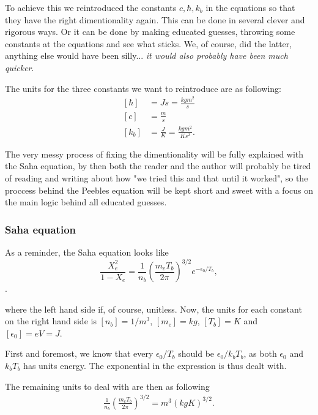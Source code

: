 \documentclass[12pt]{article}
\begin{document}
To achieve this we reintroduced the constants $c, \hbar, k_b$ in the equations so that they have the right dimentionality again. This can be done in several clever and rigorous ways. Or it can be done by making educated guesses, throwing some constants at the equations and see what sticks. We, of course, did the latter, anything else would have been silly... \textit{it would also probably have been much quicker}.

The units for the three constants we want to reintroduce are as following:
\begin{align*}
    \left[\hbar\right] &= Js = \frac{kgm^2}{s} \\
    \left[c\right] &= \frac{m}{s} \\
    \left[k_b\right] &= \frac{J}{K} = \frac{kgm^2}{Ks^2}.
\end{align*}

The very messy process of fixing the dimentionality will be fully explained with the Saha equation, by then both the reader and the author will probably be tired of reading and writing about how "we tried this and that until it worked", so the proccess behind the Peebles equation will be kept short and sweet with a focus on the main logic behind all educated guesses.

\subsubsection{Saha equation}
As a reminder, the Saha equation looks like 
\begin{equation}\label{eq: saha equation again}
    \frac{X_{e}^{2}}{1-X_{e}}=\frac{1}{n_{b}}\left(\frac{m_{e} T_{b}}{2 \pi}\right)^{3 / 2} e^{-\epsilon_{0} / T_{b}},
\end{equation}.

where the left hand side if, of course, unitless. Now, the units for each constant on the right hand side is $[n_b] = 1/m^3$, $[m_e]=kg$, $[T_b] = K$ and $[\epsilon_0] = eV = J$. 

First and foremost, we know that every $\epsilon_0/T_b$ should be $\epsilon_0/k_b T_b$, as both $\epsilon_0$ and $k_b T_b$ has units energy. The exponential in the expression is thus dealt with. 

The remaining units to deal with are then as following
\begin{align}
    \frac{1}{n_{b}}\left(\frac{m_{e} T_{b}}{2 \pi}\right)^{3 / 2} = m^3(kgK)^{3/2}.
\end{align}
\end{document}
